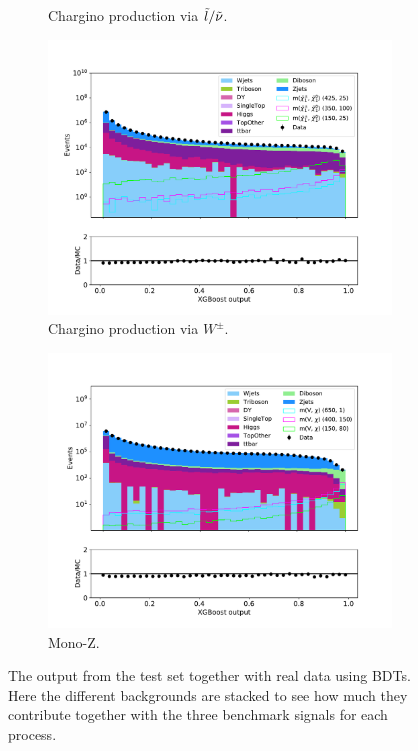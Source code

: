 \begin{figure}[H]
\begin{subfigure}[t!]{0.49\textwidth}
        \caption{Chargino production via $\Tilde{l}/\Tilde{\nu}$.}
        \label{fig:BDTdataAllSlepsnu}
    \end{subfigure}      
    \begin{subfigure}[t!]{0.49\textwidth}
        \includegraphics[width = \textwidth]{Figures/Stacked/stackedplot_BDT_All_level_WW.pdf}
        \caption{Chargino production via $W^\pm$.}
        \label{fig:BDTdataAllWW}
    \end{subfigure}
    \begin{subfigure}[t!]{0.49\textwidth}
        \includegraphics[width = \textwidth]{Figures/Stacked/stackedplot_BDT_All_level_monoZ.pdf}
        \caption{Mono-Z.}
        \label{fig:BDTdataAllmonoZ}
    \end{subfigure}
    \caption{The output from the test set together with real data using BDTs. Here the different backgrounds are stacked to see how much they contribute together with the three benchmark signals for each process.}
    \label{fig:BDTdataAll}
\end{figure}


